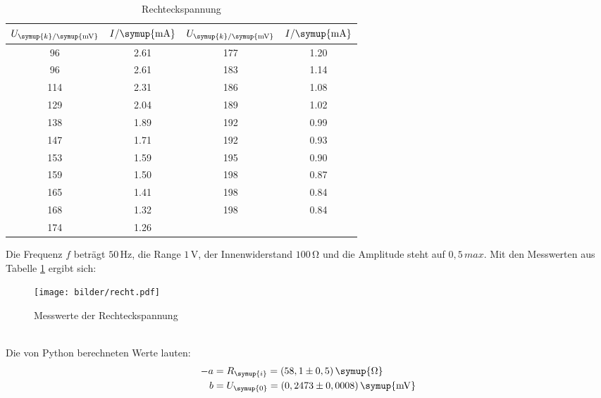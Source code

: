 \begin{table}[H]
  \centering
  \begin{tabular}{c c c c}
    \toprule
    $U_{\symup{k}/\symup{\si{\milli\volt}}}$ & $I/\symup{\si{\milli\ampere}}$  &
    $U_{\symup{k}/\symup{\si{\milli\volt}}}$ & $I/\symup{\si{\milli\ampere}}$  \\
    \midrule
     96   &  2.61  &  177  &  1.20  \\
     96   &  2.61  &  183  &  1.14  \\
    114   &  2.31  &  186  &  1.08  \\
    129   &  2.04  &  189  &  1.02  \\
    138   &  1.89  &  192  &  0.99  \\
    147   &  1.71  &  192  &  0.93  \\
    153   &  1.59  &  195  &  0.90  \\
    159   &  1.50  &  198  &  0.87  \\
    165   &  1.41  &  198  &  0.84  \\
    168   &  1.32  &  198  &  0.84  \\
    174   &  1.26  &  \hrulefill  & \hrulefill  \\
    \bottomrule
  \end{tabular}
  \caption{Rechteckspannung}
  \label{tab:recht}
\end{table}
Die Frequenz $f$ beträgt $50\,\si{\hertz}$, die Range $1 \,\si{\volt}$,
der Innenwiderstand $100\,\si{\ohm}$ und die Amplitude steht auf $0,5 \, max$.
Mit den Messwerten aus Tabelle \ref{tab:recht} ergibt sich:
\begin{figure}[h]
  \centering
  \texttt{[image: bilder/recht.pdf]}
  \caption{Messwerte der Rechteckspannung}
  \label{fig:re}
\end{figure}
\\
Die von Python berechneten Werte lauten:
\begin{align*}
   -a &= R_\symup{i} = (58,1 \pm 0,5)\, \symup{\si{\ohm}} \\ %
   b &= U_\symup{0} = (0,2473 \pm 0,0008)\,\symup{\si{\milli\volt}}
\end{align*}



